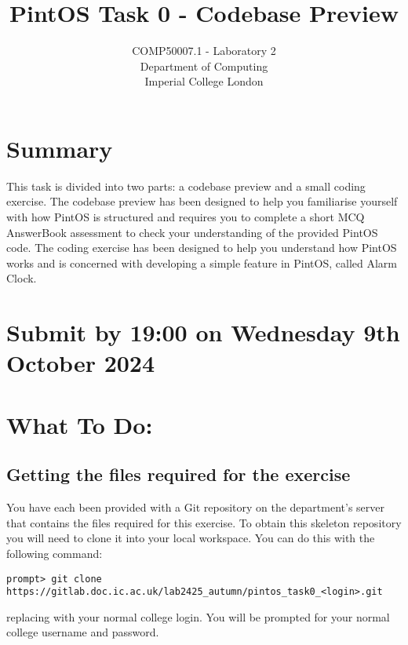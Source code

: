 \documentclass[a4paper,11pt]{article}
\begin{document}

\title{PintOS Task 0 - Codebase Preview}
\date{}

\author{
COMP50007.1 - Laboratory 2 \\
Department of Computing \\
Imperial College London
}

\maketitle

\section*{Summary}
This task is divided into two parts: a codebase preview and a small coding exercise.
The codebase preview has been designed to help you familiarise yourself with how PintOS is structured
and requires you to complete a short MCQ AnswerBook assessment to check your understanding of the provided PintOS code.
The coding exercise has been designed to help you understand how PintOS works
and is concerned with developing a simple feature in PintOS, called Alarm Clock.

\section*{Submit by 19:00 on Wednesday 9th October 2024}

\section*{What To Do:}

\subsection*{Getting the files required for the exercise}

You have each been provided with a Git repository on the department's  server that contains the files required for this exercise.
To obtain this skeleton repository you will need to clone it into your local workspace.
You can do this with the following command:
%
\begin{verbatim}
prompt> git clone https://gitlab.doc.ic.ac.uk/lab2425_autumn/pintos_task0_<login>.git
\end{verbatim}
%
replacing  with your normal college login.
You will be prompted for your normal college username and password.
\end{document}
